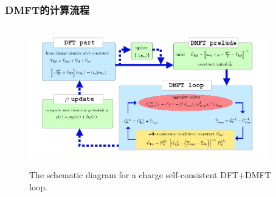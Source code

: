 \frame
{
	\frametitle{\textrm{DMFT}的计算流程}
\begin{figure}[h!]
\centering
\vspace{-2pt}
\includegraphics[height=2.4in,width=4.05in,viewport=30 10 760 420,clip]{Figures/DMFT_flowchart.png}
\caption{\textrm{\tiny The schematic diagram for a charge self-consistent DFT+DMFT loop.}}%
\label{DFT-DMFT-Flowchart}
\end{figure}
}
\frame[allowframebreaks]
